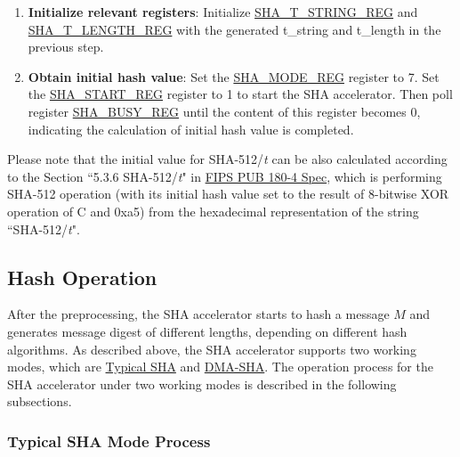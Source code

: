 \documentclass[main\_\_EN.tex]{subfiles}
\begin{document}
\begin{enumerate}
\begin{itemize}
        For example, if {\it{t}} = 231, then $t_0$ = 1, $t_1$ = 3, $t_2$ = 2, and $t\_string$ = $32'h32333180$.

    \end{itemize}
    \item \textbf{Initialize relevant registers}: Initialize \hyperref[regdesc:SHATSTRINGREG]{SHA\_T\_STRING\_REG} and  \hyperref[regdesc:SHATLENGTHREG]{SHA\_T\_LENGTH\_REG} with the generated t\_string and t\_length in the previous step.

    \item \textbf{Obtain initial hash value}: Set the \hyperref[regdesc:SHAMODEREG]{SHA\_MODE\_REG} register to 7. Set the \hyperref[regdesc:SHASTARTREG]{SHA\_START\_REG} register to 1 to start the SHA accelerator. Then poll register \hyperref[regdesc:SHABUSYREG]{SHA\_BUSY\_REG} until the content of this register becomes 0, indicating the calculation of initial hash value is completed.
\end{enumerate}

Please note that the initial value for SHA-512/{\it{t}} can be also calculated according to the Section ``5.3.6 SHA-512/{\it{t}}" in \href{https://doi.org/10.6028/NIST.FIPS.180-4}{FIPS PUB 180-4 Spec}, which is performing SHA-512 operation (with its initial hash value set to the result of 8-bitwise XOR operation of C and 0xa5) from the hexadecimal representation of the string ``SHA-512/{\it{t}}".

\subsection{Hash Operation}\label{sec:sha-hash-operation}

After the preprocessing, the \chipname{} SHA accelerator starts to hash a message \begin{math}M\end{math} and generates message digest of different lengths, depending on different hash algorithms. As described above, the \chipname{} SHA accelerator supports two working modes, which are \hyperref[sec:sha-typical-sha]{Typical SHA} and \hyperref[sec:sha-dma-sha]{DMA-SHA}. The
operation process for the SHA accelerator under two working modes is described in the following subsections.

\subsubsection{Typical SHA Mode Process}\label{sec:sha-typical-sha}
\end{document}
